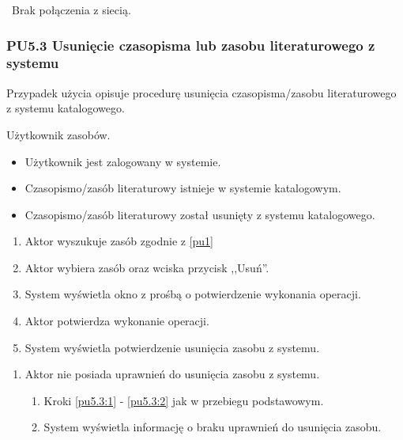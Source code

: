 \
Brak połączenia z siecią.

\subsubsection{PU5.3 Usunięcie czasopisma lub zasobu literaturowego z systemu}

Przypadek użycia opisuje procedurę usunięcia czasopisma/zasobu literaturowego z systemu katalogowego.

Użytkownik zasobów.

\begin{itemize}
\item Użytkownik jest zalogowany w systemie.
\item Czasopismo/zasób literaturowy istnieje w systemie katalogowym.
\end{itemize}

\begin{itemize}
\item Czasopismo/zasób literaturowy został usunięty z systemu katalogowego.
\end{itemize}

\begin{enumerate}
\item \label{pu5.3:1} Aktor wyszukuje zasób zgodnie z \ref{pu1}
\item \label{pu5.3:2} Aktor wybiera zasób oraz wciska przycisk ,,Usuń''.
\item System wyświetla okno z prośbą o potwierdzenie wykonania operacji.
\item Aktor potwierdza wykonanie operacji.
\item System wyświetla potwierdzenie usunięcia zasobu z systemu.
\end{enumerate}

\begin{enumerate}
\item Aktor nie posiada uprawnień do usunięcia zasobu z systemu.
	\begin{enumerate}[label*=\arabic*.]
		\item Kroki \ref{pu5.3:1} - \ref{pu5.3:2} jak w przebiegu podstawowym.
		\item System wyświetla informację o braku uprawnień do usunięcia zasobu.
	\end{enumerate}
\end{enumerate}

